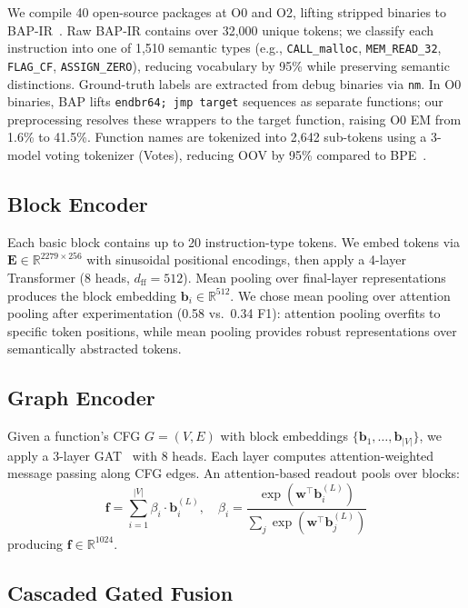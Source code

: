 \documentclass[sigconf,nonacm]{acmart}
\begin{document}
We compile 40 open-source packages at O0 and O2, lifting stripped binaries to BAP-IR~\cite{bap}. Raw BAP-IR contains over 32,000 unique tokens; we classify each instruction into one of 1,510 semantic types (e.g., \texttt{CALL\_malloc}, \texttt{MEM\_READ\_32}, \texttt{FLAG\_CF}, \texttt{ASSIGN\_ZERO}), reducing vocabulary by 95\% while preserving semantic distinctions. Ground-truth labels are extracted from debug binaries via \texttt{nm}. In O0 binaries, BAP lifts \texttt{endbr64; jmp target} sequences as separate functions; our preprocessing resolves these wrappers to the target function, raising O0 EM from 1.6\% to 41.5\%. Function names are tokenized into 2,642 sub-tokens using a 3-model voting tokenizer (Votes), reducing OOV by 95\% compared to BPE~\cite{bpe}.

\subsection{Block Encoder}

Each basic block contains up to 20 instruction-type tokens. We embed tokens via $\mathbf{E} \in \mathbb{R}^{2279 \times 256}$ with sinusoidal positional encodings, then apply a 4-layer Transformer (8 heads, $d_\text{ff}{=}512$). Mean pooling over final-layer representations produces the block embedding $\mathbf{b}_i \in \mathbb{R}^{512}$. We chose mean pooling over attention pooling after experimentation (0.58 vs.\ 0.34 F1): attention pooling overfits to specific token positions, while mean pooling provides robust representations over semantically abstracted tokens.

\subsection{Graph Encoder}

Given a function's CFG $G = (V, E)$ with block embeddings $\{\mathbf{b}_1, \ldots, \mathbf{b}_{|V|}\}$, we apply a 3-layer GAT~\cite{velivckovic2018graph} with 8 heads. Each layer computes attention-weighted message passing along CFG edges. An attention-based readout pools over blocks:
\begin{equation}
    \mathbf{f} = \sum_{i=1}^{|V|} \beta_i \cdot \mathbf{b}_i^{(L)}, \quad \beta_i = \frac{\exp(\mathbf{w}^\top \mathbf{b}_i^{(L)})}{\sum_{j} \exp(\mathbf{w}^\top \mathbf{b}_j^{(L)})}
\end{equation}
producing $\mathbf{f} \in \mathbb{R}^{1024}$.

\subsection{Cascaded Gated Fusion}
\label{sec:fusion}
\end{document}
